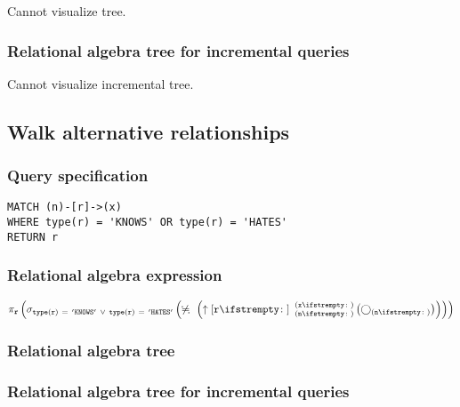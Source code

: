 Cannot visualize tree.

\subsubsection*{Relational algebra tree for incremental queries}

Cannot visualize incremental tree.

\subsection{Walk alternative relationships}

\subsubsection*{Query specification}

\begin{lstlisting}
MATCH (n)-[r]->(x)
WHERE type(r) = 'KNOWS' OR type(r) = 'HATES'
RETURN r
\end{lstlisting}

\subsubsection*{Relational algebra expression}

$\projection{\var{r}} \left(\selection{\mathtt{type(r)~=~'KNOWS'~\lor~type(r)~=~'HATES'}} \left(\alldifferent{} \left(\expandout{r}{}{n}{x}{} \left(\getvertices{n}{}\right)\right)\right)\right)$

\subsubsection*{Relational algebra tree}


\subsubsection*{Relational algebra tree for incremental queries}

